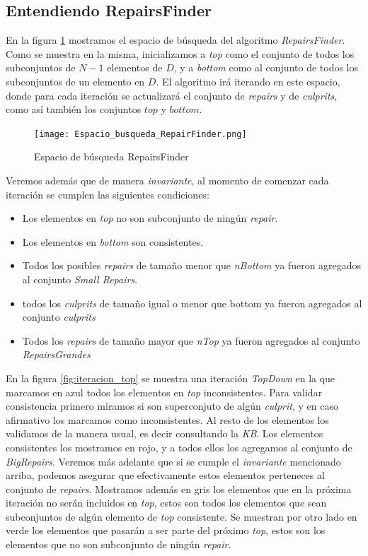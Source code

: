 \documentclass[11pt,a4paper,twoside]{tesis}
\begin{document}
\subsection{Entendiendo RepairsFinder}

En la figura \ref{fig:espacio_busqueda_repair_finder} mostramos el espacio de búsqueda del algoritmo \textit{RepairsFinder}. Como se muestra en la misma, inicializamos a \textit{top} como el conjunto de todos los subconjuntos de $N - 1$ elementos de $D$, y a \textit{bottom} como al conjunto de todos los subconjuntos de un elemento en $D$. El algoritmo irá iterando en este espacio, donde para cada iteración se actualizará el conjunto de \textit{repairs} y de \textit{culprits}, como así también los conjuntos $top$ y $bottom$. 



\begin{figure}[ht]
    \texttt{[image: Espacio\_busqueda\_RepairFinder.png]}
    \centering
    \caption{Espacio de búsqueda RepairsFinder}
    \label{fig:espacio_busqueda_repair_finder}
\end{figure}

Veremos además que de manera \textit{invariante}, al momento de comenzar cada iteración se cumplen las siguientes condiciones:

\begin{itemize}
    \item Los elementos en \textit{top} no son subconjunto de ningún \textit{repair}.
    \item Los elementos en \textit{bottom} son consistentes.
    \item Todos los posibles \textit{repairs} de tamaño menor que \textit{nBottom} ya fueron agregados al conjunto \textit{Small Repairs}.
    \item todos los \textit{culprits} de tamaño igual o menor que bottom ya fueron agregados al conjunto \textit{culprits}
    \item Todos los \textit{repairs} de tamaño mayor que \textit{nTop} ya fueron agregados al conjunto \textit{RepairsGrandes}
\end{itemize}

En la figura \ref{fig:iteracion_top} se muestra una iteración \textit{TopDown} en la que marcamos en azul todos los elementos en \textit{top} inconsistentes. Para validar consistencia primero miramos si son superconjuto de algún \textit{culprit}, y en caso afirmativo los marcamos como inconsistentes. Al resto de los elementos los validamos de la manera usual, es decir consultando la \textit{KB}. Los elementos consistentes los mostramos en rojo, y a todos ellos los agregamos al conjunto de \textit{BigRepairs}. Veremos más adelante que si se cumple el \textit{invariante} mencionado arriba, podemos asegurar que efectivamente estos elementos perteneces al conjunto de \textit{repairs}. Mostramos además en gris los elementos que en la próxima iteración no serán incluidos en \textit{top}, estos son todos los elementos que sean subconjuntos de algún elemento de \textit{top} consistente. Se muestran por otro lado en verde los elementos que pasarán a ser parte del próximo \textit{top}, estos son los elementos que no son subconjunto de ningún \textit{repair}.
\end{document}
